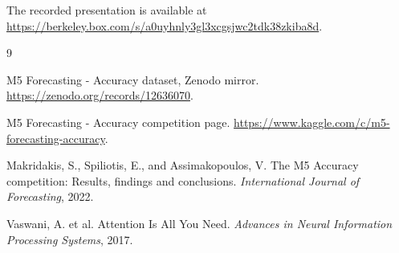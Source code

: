 \documentclass[11pt]{article}
\begin{document}
The recorded presentation is available at \url{https://berkeley.box.com/s/a0uyhnly3gl3xcgsjwc2tdk38zkiba8d}.

\begin{thebibliography}{9}

M5 Forecasting - Accuracy dataset, Zenodo mirror. \url{https://zenodo.org/records/12636070}.

M5 Forecasting - Accuracy competition page. \url{https://www.kaggle.com/c/m5-forecasting-accuracy}.

Makridakis, S., Spiliotis, E., and Assimakopoulos, V. The M5 Accuracy competition: Results, findings and conclusions. \textit{International Journal of Forecasting}, 2022.

Vaswani, A. et al. Attention Is All You Need. \textit{Advances in Neural Information Processing Systems}, 2017.

\end{thebibliography}
\end{document}
